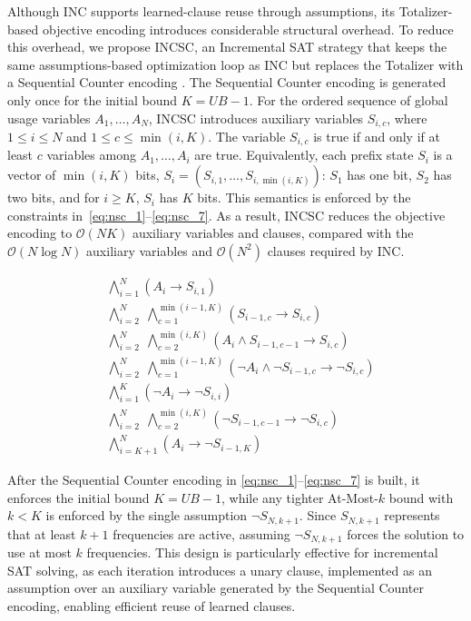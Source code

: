 \documentclass[letterpaper,journal]{IEEEtran}
\begin{document}
Although INC supports learned-clause reuse through assumptions, its Totalizer-based objective encoding introduces considerable structural overhead. To reduce this overhead, we propose INCSC, an Incremental SAT strategy that keeps the same assumptions-based optimization loop as INC but replaces the Totalizer with a Sequential Counter encoding \cite{Sinz2005}. The Sequential Counter encoding is generated only once for the initial bound $K=UB-1$. 
For the ordered sequence of global usage variables $A_1,\dots,A_N$, INCSC introduces auxiliary variables $S_{i,c}$, where $1 \le i \le N$ and $1 \le c \le \min(i,K)$. The variable $S_{i,c}$ is true if and only if at least $c$ variables among $A_1,\dots,A_i$ are true. Equivalently, each prefix state $S_i$ is a vector of $\min(i,K)$ bits, $S_i=(S_{i,1},\dots,S_{i,\min(i,K)})$: $S_1$ has one bit, $S_2$ has two bits, and for $i \ge K$, $S_i$ has $K$ bits. This semantics is enforced by the constraints in~\eqref{eq:nsc_1}--\eqref{eq:nsc_7}. As a result, INCSC reduces the objective encoding to $\mathcal{O}(NK)$ auxiliary variables and clauses, compared with the $\mathcal{O}(N \log N)$ auxiliary variables and $\mathcal{O}(N^2)$ clauses required by INC.

\begin{align}
    & \bigwedge_{i=1}^{N} \left( A_i \rightarrow S_{i,1} \right) \label{eq:nsc_1} \\
    & \bigwedge_{i=2}^{N} \;\bigwedge_{c=1}^{\min(i-1,K)} \left( S_{i-1,c} \rightarrow S_{i,c} \right) \label{eq:nsc_2} \\
    & \bigwedge_{i=2}^{N} \;\bigwedge_{c=2}^{\min(i,K)} \left( A_i \land S_{i-1,c-1} \rightarrow S_{i,c} \right) \label{eq:nsc_3} \\
    & \bigwedge_{i=2}^{N} \;\bigwedge_{c=1}^{\min(i-1,K)} \left( \neg A_i \land \neg S_{i-1,c} \rightarrow \neg S_{i,c} \right) \label{eq:nsc_4} \\
    & \bigwedge_{i=1}^{K} \left( \neg A_i \rightarrow \neg S_{i,i} \right) \label{eq:nsc_5} \\
    & \bigwedge_{i=2}^{N} \;\bigwedge_{c=2}^{\min(i,K)} \left( \neg S_{i-1,c-1} \rightarrow \neg S_{i,c} \right) \label{eq:nsc_6} \\
    & \bigwedge_{i=K+1}^{N} \left( A_i \rightarrow \neg S_{i-1,K} \right) \label{eq:nsc_7}
\end{align}

After the Sequential Counter encoding in \eqref{eq:nsc_1}--\eqref{eq:nsc_7} is built, it enforces the initial bound $K=UB-1$, while any tighter At-Most-$k$ bound with $k<K$ is enforced by the single assumption $\neg S_{N,k+1}$.
Since $S_{N,k+1}$ represents that at least $k+1$ frequencies are active, assuming $\neg S_{N,k+1}$ forces the solution to use at most $k$ frequencies. 
This design is particularly effective for incremental SAT solving, as each iteration introduces a unary clause, implemented as an assumption over an auxiliary variable generated by the Sequential Counter encoding, enabling efficient reuse of learned clauses.
\end{document}

